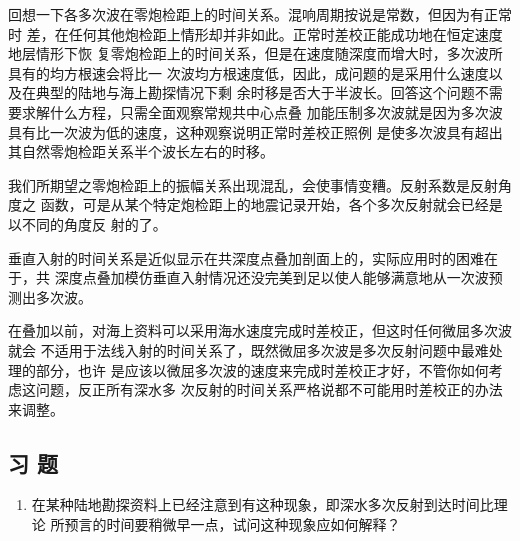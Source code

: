 回想一下各多次波在零炮检距上的时间关系。混响周期按说是常数，但因为有正常时
差，在任何其他炮检距上情形却并非如此。正常时差校正能成功地在恒定速度地层情形下恢
复零炮检距上的时间关系，但是在速度随深度而增大时，多次波所具有的均方根速会将比一
次波均方根速度低，因此，成问题的是采用什么速度以及在典型的陆地与海上勘探情况下剩
余时移是否大于半波长。回答这个问题不需要求解什么方程，只需全面观察常规共中心点叠
加能压制多次波就是因为多次波具有比一次波为低的速度，这种观察说明正常时差校正照例
是使多次波具有超出其自然零炮检距关系半个波长左右的时移。

我们所期望之零炮检距上的振幅关系出现混乱，会使事情变糟。反射系数是反射角度之
函数，可是从某个特定炮检距上的地震记录开始，各个多次反射就会已经是以不同的角度反
射的了。

垂直入射的时间关系是近似显示在共深度点叠加剖面上的，实际应用时的困难在于，共
深度点叠加模仿垂直入射情况还没完美到足以使人能够满意地从一次波预测出多次波。

在叠加以前，对海上资料可以采用海水速度完成时差校正，但这时任何微屈多次波就会
不适用于法线入射的时间关系了，既然微屈多次波是多次反射问题中最难处理的部分，也许
是应该以微屈多次波的速度来完成时差校正才好，不管你如何考虑这问题，反正所有深水多
次反射的时间关系严格说都不可能用时差校正的办法来调整。

\subsection{习 题}
\label{sec:5.5.9}

\begin{enumerate}
\item 在某种陆地勘探资料上已经注意到有这种现象，即深水多次反射到达时间比理论
所预言的时间要稍微早一点，试问这种现象应如何解释？
\end{enumerate}